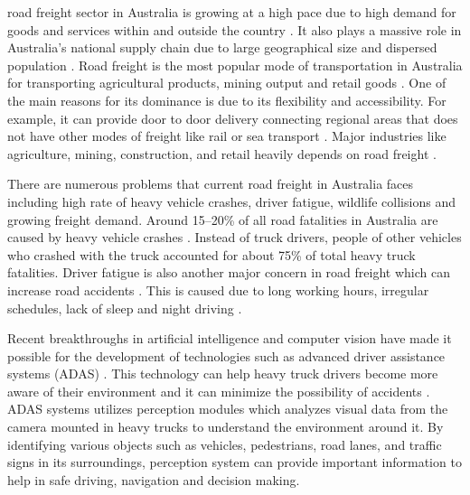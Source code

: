 \documentclass[10pt,journal,compsoc]{IEEEtran}
\begin{document}
 road freight sector in Australia is growing at a high pace due to high demand for goods and services within and outside the country \cite{Peters2023}. It also plays a massive role in Australia's national supply chain due to large geographical size and dispersed population \cite{BITRE2023}. Road freight is the most popular mode of transportation in Australia for transporting agricultural products, mining output and retail goods \cite{BITRE2023}. One of the main reasons for its dominance is due to its flexibility and accessibility. For example, it can provide door to door delivery connecting regional areas that does not have other modes of freight like rail or sea transport \cite{BITRE2023}. Major industries like agriculture, mining, construction, and retail heavily depends on road freight \cite{BITRE2023}.

There are numerous problems that current road freight in Australia faces including high rate of heavy vehicle crashes, driver fatigue, wildlife collisions and growing freight demand. Around 15--20\% of all road fatalities in Australia are caused by heavy vehicle crashes \cite{bitre_safety_statistics}. Instead of truck drivers, people of other vehicles who crashed with the truck accounted for about 75\% of total heavy truck fatalities\cite{bitre_safety_statistics}. Driver fatigue is also another major concern in road freight which can increase road accidents \cite{CASEY2024136} . This is caused due to long working hours, irregular schedules, lack of sleep and night driving \cite{CASEY2024136}.

Recent breakthroughs in artificial intelligence and computer vision have made it possible for the development of technologies such as advanced driver assistance systems (ADAS) \cite{s24196223}. This technology can help heavy truck drivers become more aware of their environment and it can minimize the possibility of accidents \cite{s24196223}. ADAS systems utilizes perception modules which analyzes visual data from the camera mounted in heavy trucks to understand the environment around it. By identifying various objects such as vehicles, pedestrians, road lanes, and traffic signs in its surroundings, perception system can provide important information to help in safe driving, navigation and decision making.
\end{document}
